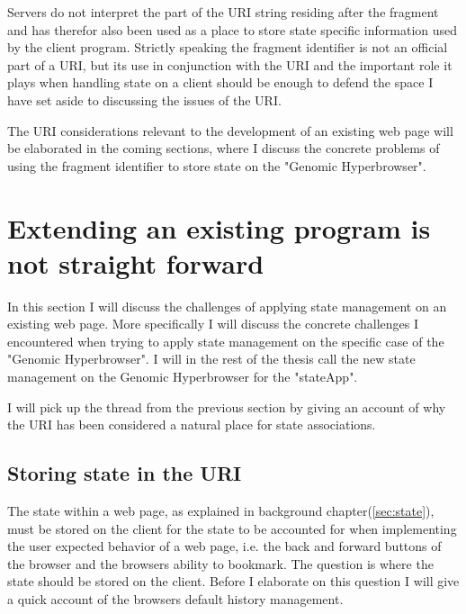 \documentclass[english]{ifimaster}
\begin{document}
Servers do not interpret the part of the URI string residing after the fragment and has therefor also been used as a place to store state specific information used by the client program. Strictly speaking the fragment identifier is not an official part of a URI, but its use in conjunction with the URI and the important role it plays when handling state on a client should be enough to defend the space I have set aside to discussing the issues of the URI.

The URI considerations relevant to the development of an existing web page will be elaborated in the coming sections, where I discuss the concrete problems of using the fragment identifier to store state on the "Genomic Hyperbrowser". 

\section{Extending an existing program is not straight forward}
In this section I will discuss the challenges of applying state management on an existing web page. More specifically I will discuss the concrete challenges I encountered when trying to apply state management on the specific case of the "Genomic Hyperbrowser". I will in the rest of the thesis call the new state management on the Genomic Hyperbrowser for the "stateApp".

I will pick up the thread from the previous section by giving an account of why the URI has been considered a natural place for state associations.

\subsection{Storing state in the URI}
The state within a web page, as explained in background chapter(\ref{sec:state}), must be stored on the client for the state to be accounted for when implementing the user expected behavior of a web page, i.e. the back and forward buttons of the browser and the browsers ability to bookmark. The question is where the state should be stored on the client. Before I elaborate on this question I will give a quick account of the browsers default history management.%

\end{document}
